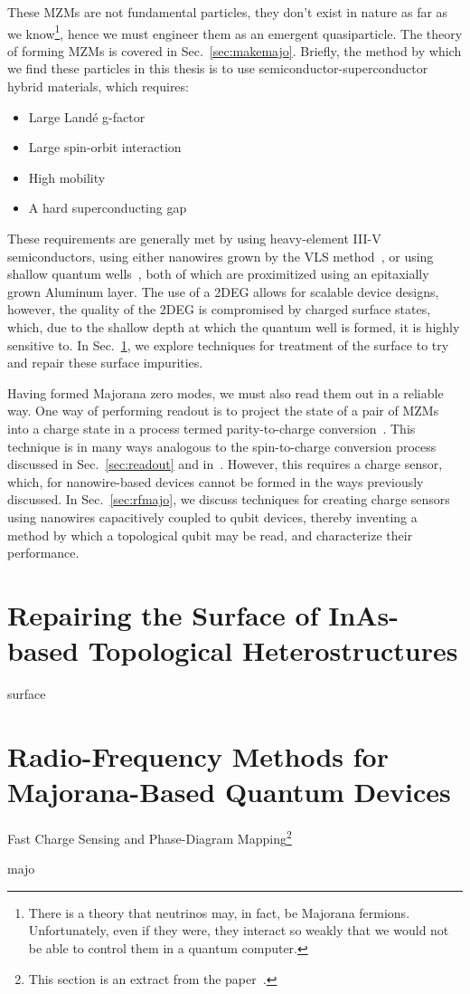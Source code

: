 These MZMs are not fundamental particles, they don't exist in nature as far as we know\footnote{There is a theory that neutrinos may, in
fact, be Majorana fermions. Unfortunately, even if they were, they interact so weakly that we would not be able to control them in a quantum computer.},
hence we must engineer them as an emergent quasiparticle. The theory of forming MZMs is covered in Sec.~\ref{sec:makemajo}. Briefly, the method by
which we find these particles in this thesis is to use semiconductor-superconductor hybrid materials, which requires:
\begin{itemize}
    \item Large Land\'e g-factor
    \item Large spin-orbit interaction
    \item High mobility
    \item A hard superconducting gap
\end{itemize}
These requirements are generally met by using heavy-element III-V semiconductors, using either nanowires grown by the VLS method~\cite{nnano.2014.306,Krogstrup},
or using shallow quantum wells~\cite{PhysRevB.93.155402}, both of which are proximitized using an epitaxially grown Aluminum layer. The use of a 2DEG allows
for scalable device designs, however, the quality of the 2DEG is compromised by charged surface states, which, due to the shallow depth at which the quantum
well is formed, it is highly sensitive to. In Sec.~\ref{sec:inas_hb}, we explore techniques for treatment of the surface to try and repair these surface impurities.

Having formed Majorana zero modes, we must also read them out in a reliable way. One way of performing readout is to project the state of a pair of MZMs into
a charge state in a process termed parity-to-charge conversion~\cite{AasenPRX16}. This technique is in many ways analogous to the spin-to-charge conversion
process discussed in Sec.~\ref{sec:readout} and in~\cite{petta,RevModPhys.79.1217}. However, this requires a charge sensor, which, for nanowire-based devices cannot
be formed in the ways previously discussed. In Sec.~\ref{sec:rfmajo}, we discuss techniques for creating charge sensors using nanowires capacitively coupled
to qubit devices, thereby inventing a method by which a topological qubit may be read, and characterize their performance.

\clearpage
\section{Repairing the Surface of InAs-based Topological Heterostructures}
\label{sec:inas_hb}
{surface}

\clearpage
\section{Radio-Frequency Methods for {Majorana-Based} {Quantum} {Devices}}
{\large \bf \begin{center}Fast Charge Sensing and Phase-Diagram Mapping\footnote{
    This section is an extract from the paper~\cite{PhysRevApplied.11.064011}.
}\end{center}}
\label{sec:rfmajo}
{majo}


